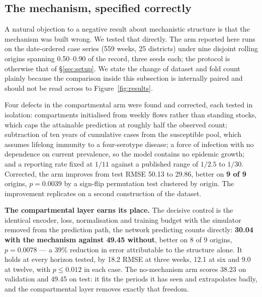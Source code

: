 %
%     
%

\subsection{The mechanism, specified correctly}
\label{sec:mechanism-corrected}

A natural objection to a negative result about mechanistic structure is that the
mechanism was built wrong. We tested that directly. The arm reported here runs on
the date-ordered case series (559 weeks, 25 districts) under nine disjoint
rolling origins spanning 0.50--0.90 of the record, three seeds each; the protocol
is otherwise that of \S\ref{sec:setup}. We state the change of dataset and fold
count plainly because the comparison inside this subsection is internally paired
and should not be read across to Figure~\ref{fig:results}.

Four defects in the compartmental arm were found and corrected, each tested in
isolation: compartments initialised from weekly flows rather than standing stocks,
which caps the attainable prediction at roughly half the observed count;
subtraction of ten years of cumulative cases from the susceptible pool, which
assumes lifelong immunity to a four-serotype disease; a force of infection with
no dependence on current prevalence, so the model contains no epidemic growth;
and a reporting rate fixed at $1/11$ against a published range of $1/2.5$ to
$1/30$. Corrected, the arm improves from test RMSE 50.13 to 29.86, better on
\textbf{9 of 9} origins, $p = 0.0039$ by a sign-flip permutation test clustered
by origin. The improvement replicates on a second construction of the dataset.

\textbf{The compartmental layer earns its place.} The decisive control is the
identical encoder, loss, normalisation and training budget with the simulator
removed from the prediction path, the network predicting counts directly:
\textbf{30.04 with the mechanism against 49.45 without}, better on 8 of 9
origins, $p = 0.0078$ --- a 39\% reduction in error attributable to the structure
alone. It holds at every horizon tested, by 18.2 RMSE at three weeks, 12.1 at six
and 9.0 at twelve, with $p \le 0.012$ in each case. The no-mechanism arm scores
38.23 on validation and 49.45 on test: it fits the periods it has seen and
extrapolates badly, and the compartmental layer removes exactly that freedom.

